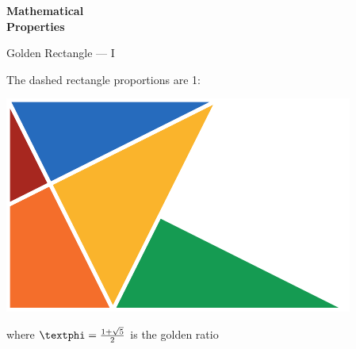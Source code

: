 \documentclass[14pt]{beamer}
\begin{document}

    \begin{frame}{}
        \begin{center}
            \textbf{\Huge Mathematical\\\bigskip Properties}\\
        \end{center}
    \end{frame}


    \begin{frame}{Golden Rectangle --- I}
        \begin{center}
            The dashed rectangle proportions are 1:\textphi
        \end{center}
        \hspace{4.1em} \includegraphics[scale=1.0]{figures/figure030a.pdf} \\
        \begin{center}
            where $\text{\textphi} =\tfrac{1+\sqrt{5}}{2}$ is the golden ratio
        \end{center}
    \end{frame}

\end{document}
